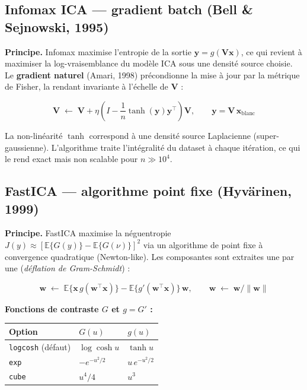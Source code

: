 \documentclass[12pt, a4paper]{article}
\newcommand{\V}{\mathbf{V}}        %
\newcommand{\x}{\mathbf{x}}        %
\newcommand{\y}{\mathbf{y}}        %
\newcommand{\E}{\mathbb{E}}        %
\begin{document}
\subsection{Infomax ICA — gradient batch (Bell \& Sejnowski, 1995)}

\textbf{Principe.}
Infomax \cite{bell1995} maximise l'entropie de la sortie $\y = g(\V\x)$, ce qui revient à
maximiser la log-vraisemblance du modèle ICA sous une densité source choisie.
Le \textbf{gradient naturel} (Amari, 1998) précondionne la mise à jour par la métrique de
Fisher, la rendant invariante à l'échelle de $\V$ :

\begin{formulabox}
\[
  \V \;\leftarrow\; \V + \eta \left( I - \frac{1}{n}\tanh(\y)\y^\top \right) \V,
  \qquad \y = \V\,\x_{\text{blanc}}
\]
\end{formulabox}

La non-linéarité $\tanh$ correspond à une densité source Laplacienne (super-gaussienne).
L'algorithme traite l'intégralité du dataset à chaque itération, ce qui le rend exact
mais non scalable pour $n \gg 10^4$.

\subsection{FastICA — algorithme point fixe (Hyvärinen, 1999)}

\textbf{Principe.}
FastICA \cite{hyvarinen1999} maximise la néguentropie $J(y) \approx [\E\{G(y)\} - \E\{G(\nu)\}]^2$
via un algorithme de point fixe à convergence quadratique (Newton-like).
Les composantes sont extraites une par une (\textit{déflation de Gram-Schmidt}) :

\begin{formulabox}
\[
  \mathbf{w} \;\leftarrow\; \E\{\x\,g(\mathbf{w}^\top\x)\} - \E\{g'(\mathbf{w}^\top\x)\}\,\mathbf{w},
  \qquad \mathbf{w} \;\leftarrow\; \mathbf{w}/\|\mathbf{w}\|
\]
\end{formulabox}

\textbf{Fonctions de contraste $G$ et $g = G'$ :}

\begin{center}
\begin{tabular}{lll}
\toprule
\textbf{Option} & $G(u)$ & $g(u)$ \\
\midrule
\texttt{logcosh} (défaut) & $\log\cosh u$ & $\tanh u$ \\
\texttt{exp}              & $-e^{-u^2/2}$ & $u\,e^{-u^2/2}$ \\
\texttt{cube}             & $u^4/4$       & $u^3$ \\
\bottomrule
\end{tabular}
\end{center}
\end{document}
